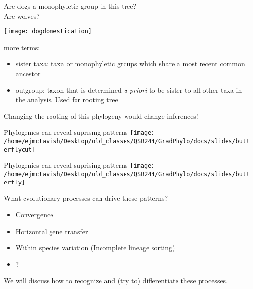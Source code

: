 \documentclass{beamer}
\begin{document}
\begin{frame}
\begin{center}
Are dogs a monophyletic group in this tree?\\
Are wolves?\\
\centerline{\texttt{[image: dogdomestication]}}
\end{center}
\end{frame}

\begin{frame}
more terms:
\begin{itemize}
 \item sister taxa: taxa or monophyletic groups which share a most recent common ancestor
 \item outgroup: taxon that is determined \emph{a priori} to be sister to all other taxa in the analysis. Used for rooting tree
\end{itemize}

\end{frame}








\begin{frame}
Changing the rooting of this phylogeny would change inferences!
\end{frame}


\begin{frame}
Phylogenies can reveal suprising patterns
 \texttt{[image: /home/ejmctavish/Desktop/old\_classes/QSB244/GradPhylo/docs/slides/butterflycut]}
\end{frame}

\begin{frame}
Phylogenies can reveal suprising patterns
 \texttt{[image: /home/ejmctavish/Desktop/old\_classes/QSB244/GradPhylo/docs/slides/butterfly]}
 \citep{joron_chromosomal_2011}
\end{frame}



\begin{frame}
What evolutionary processes can drive these patterns?
\begin{itemize}
 \item Convergence
 \item Horizontal gene transfer
 \item Within species variation (Incomplete lineage sorting)
 \item ?
\end{itemize}
\pause
We will discuss how to recognize and (try to) differentiate these processes.
\end{frame}
\end{document}
